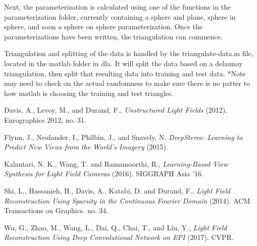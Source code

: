 \documentclass[12pt]{report}
\begin{document}
Next, the parameterization is calculated using one of the functions in the parameterization folder, currently containing a sphere and plane, sphere in sphere, and soon a sphere on sphere parameterization. Once the parameterizations have been written, the triangulation can commence. 

Triangulation and splitting of the data is handled by the triangulate-data.m file, located in the matlab folder in dla. It will split the data based on a delaunay triangulation, then split that resulting data into training and test data. *Note may need to check on the actual randomness to make sure there is no patter to how matlab is choosing the training and test triangles.

\begin{thebibliography}{10}%
	Davis, A., Levoy, M., and Durand, F., \emph{Unstructured Light Fields} (2012). Eurographics 2012, no. 31.

	Flynn, J., Neulander, I., Philbin, J., and Snavely, N. \emph{DeepStereo: Learning to Predict New Views from the World's Imagery} (2015).

	Kalantari, N. K., Wang, T. and Ramamoorthi, R., \emph{Learning-Based View Synthesis for Light Field Cameras} (2016). SIGGRAPH Asia '16.
		
	Shi, L., Hassanieh, H., Davis, A., Katabi, D. and Durand, F., \emph{Light Field Reconstruction Using Sparsity in the Continuous Fourier Domain} (2014). ACM Transactions on Graphics. no. 34.

	Wu, G., Zhao, M., Wang, L., Dai, Q., Chai, T., and Liu, Y., \emph{Light Field Reconstruction Using Deep Convolutional Network on EPI} (2017). CVPR.

\end{thebibliography}
\end{document}
